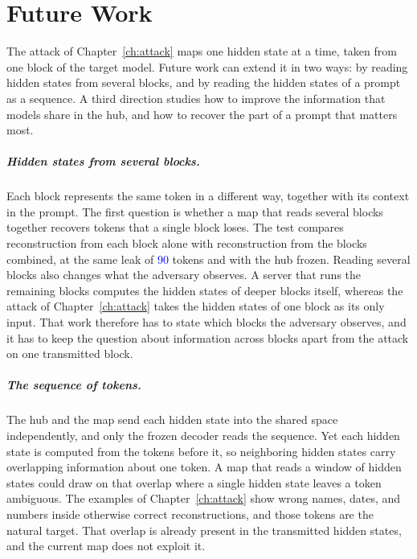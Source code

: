 \providecommand{\vf}[1]{\textcolor{blue}{#1}}
\chapter{Future Work}\label{ch:future}

The attack of Chapter~\ref{ch:attack} maps one hidden state at a time, taken from one block of the target model.
Future work can extend it in two ways: by reading hidden states from several blocks, and by reading the hidden states of a prompt as a sequence.
A third direction studies how to improve the information that models share in the hub, and how to recover the part of a prompt that matters most.

\paragraph{Hidden states from several blocks.} Each block represents the same token in a different way, together with its context in the prompt.
The first question is whether a map that reads several blocks together recovers tokens that a single block loses.
The test compares reconstruction from each block alone with reconstruction from the blocks combined, at the same leak of \vf{90} tokens and with the hub frozen.
Reading several blocks also changes what the adversary observes.
A server that runs the remaining blocks computes the hidden states of deeper blocks itself, whereas the attack of Chapter~\ref{ch:attack} takes the hidden states of one block as its only input.
That work therefore has to state which blocks the adversary observes, and it has to keep the question about information across blocks apart from the attack on one transmitted block.

\paragraph{The sequence of tokens.} The hub and the map send each hidden state into the shared space independently, and only the frozen decoder reads the sequence.
Yet each hidden state is computed from the tokens before it, so neighboring hidden states carry overlapping information about one token.
A map that reads a window of hidden states could draw on that overlap where a single hidden state leaves a token ambiguous.
The examples of Chapter~\ref{ch:attack} show wrong names, dates, and numbers inside otherwise correct reconstructions, and those tokens are the natural target.
That overlap is already present in the transmitted hidden states, and the current map does not exploit it.

